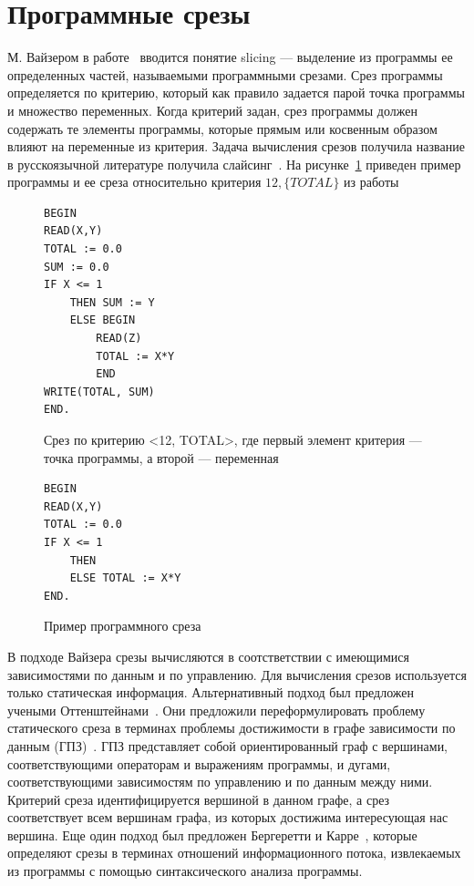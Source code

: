 \section{Программные срезы}
М. Вайзером в работе~\cite{weiser1981program} вводится понятие slicing --- выделение из программы ее определенных частей, называемыми программными срезами. Срез программы определяется по критерию, который как правило задается парой точка программы и множество переменных. Когда критерий задан, срез программы должен содержать те элементы программы, которые прямым или косвенным образом влияют на переменные из критерия. Задача вычисления срезов получила название в русскоязычной литературе получила слайсинг~\cite{2002slicing}. На рисунке~\ref{ex:slice} приведен пример программы и ее среза относительно критерия \(12, \{TOTAL\}\) из работы~\cite{weiser1981program}
\begin{figure}[]
\begin{lstlisting}
BEGIN
READ(X,Y)
TOTAL := 0.0
SUM := 0.0
IF X <= 1
	THEN SUM := Y
	ELSE BEGIN
		READ(Z)
		TOTAL := X*Y
		END
WRITE(TOTAL, SUM)
END.
\end{lstlisting}
Срез по критерию <12, {TOTAL}>, где первый элемент критерия --- точка программы, а второй --- переменная
\begin{lstlisting}
BEGIN
READ(X,Y)
TOTAL := 0.0
IF X <= 1
	THEN 
	ELSE TOTAL := X*Y
END.
\end{lstlisting}
\caption{Пример программного среза}
\label{ex:slice}
\end{figure}
В подходе Вайзера срезы вычисляются в соотстветствии с имеющимися зависимостями по данным и по управлению. Для вычисления срезов используется только статическая информация. Альтернативный подход был предложен учеными Оттенштейнами~\cite{ottenstein1984program}. Они предложили переформулировать проблему статического среза в терминах проблемы достижимости в графе зависимости по данным (ГПЗ)~\cite{ferrante1987program}. ГПЗ представляет собой ориентированный граф с вершинами, соответствующими операторам и выражениям программы, и дугами, соответствующими зависимостям по управлению и по данным между ними. Критерий среза идентифицируется вершиной в данном графе, а срез соответствует всем вершинам графа, из которых достижима интересующая нас вершина. Еще один подход был предложен Бергеретти и Карре~\cite{bergeretti1985information}, которые определяют срезы в терминах отношений информационного потока, извлекаемых из программы с помощью синтаксического анализа программы. 

